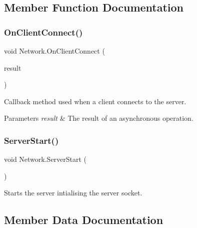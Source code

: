\subsection{Member Function Documentation}
\mbox{\label{class_network_a15f803d40cbbf25b37d279f9637ec614}} 
\subsubsection{\texorpdfstring{OnClientConnect()}{OnClientConnect()}}
{\footnotesize\ttfamily void Network.\+On\+Client\+Connect (\begin{DoxyParamCaption}\item[{I\+Async\+Result}]{result }\end{DoxyParamCaption})\hspace{0.3cm}{\ttfamily [private]}}



Callback method used when a client connects to the server. 


\begin{DoxyParams}{Parameters}
{\em result} & The result of an asynchronous operation.\\
\hline
\end{DoxyParams}
\mbox{\label{class_network_a22cabc15681adaf99a76dc9ff3106d1a}} 
\subsubsection{\texorpdfstring{ServerStart()}{ServerStart()}}
{\footnotesize\ttfamily void Network.\+Server\+Start (\begin{DoxyParamCaption}{ }\end{DoxyParamCaption})}



Starts the server intialising the server socket. 



\subsection{Member Data Documentation}
\mbox{\label{class_network_a6c14090f7cbb47a16695fd832498d83a}} 

